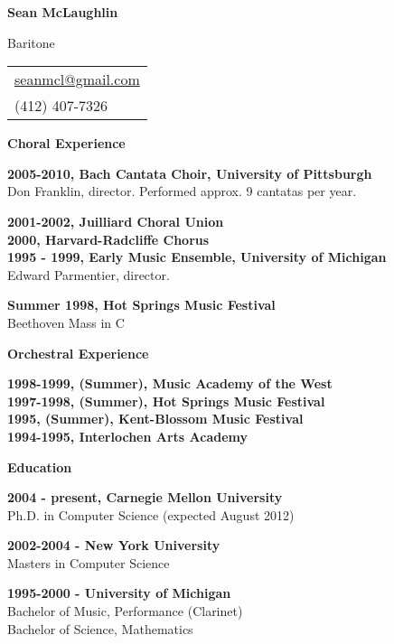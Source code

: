 \documentclass[a4paper,12pt,final]{memoir}
\newcommand{\SmallSep}{\vspace{0.5em}}
\newcommand{\CVSection}[1]
{\Large\textbf{#1}\par
  \SmallSep\normalsize\normalfont}
\newcommand{\CVItem}[1]
{\textbf{\color{RoyalBlue} #1}}
\begin{document}

\Huge\bfseries {\color{RoyalBlue} Sean McLaughlin}
\normalsize\normalfont

\SmallSep
{\Large Baritone}
\SmallSep

\begin{flushright}\small
  \vspace{-3em}
  \begin{tabular}{l}
    \url{seanmcl@gmail.com}\\
    (412) 407-7326
  \end{tabular}
\end{flushright}\normalsize

\normalsize\normalfont

\vspace{-1em}

\CVSection{Choral Experience}

\CVItem{2005-2010, Bach Cantata Choir, University of Pittsburgh}\\
Don Franklin, director.
Performed approx. 9 cantatas per year.
\SmallSep

\CVItem{2001-2002, Juilliard Choral Union}\\[6pt]
\CVItem{2000, Harvard-Radcliffe Chorus}\\[6pt]
\CVItem{1995 - 1999, Early Music Ensemble, University of Michigan}\\[6pt]
Edward Parmentier, director.
\SmallSep

\CVItem{Summer 1998, Hot Springs Music Festival} \\
Beethoven Mass in C
\SmallSep
\medskip

\CVSection{Orchestral Experience}

\CVItem{1998-1999, (Summer), Music Academy of the West} \\[6pt]
\CVItem{1997-1998, (Summer), Hot Springs Music Festival} \\[6pt]
\CVItem{1995, (Summer), Kent-Blossom Music Festival} \\[6pt]
\CVItem{1994-1995, Interlochen Arts Academy}

\bigskip

\CVSection{Education}
\CVItem{2004 - present, Carnegie Mellon University}\\
Ph.D. in Computer Science (expected August 2012)
\SmallSep

\CVItem{2002-2004 - New York University}\\
Masters in Computer Science
\SmallSep

\CVItem{1995-2000 - University of Michigan}\\
Bachelor of Music, Performance (Clarinet) \\
Bachelor of Science, Mathematics \\
\SmallSep

\end{document}
